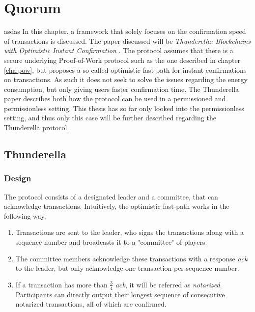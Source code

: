 \chapter{Quorum}
\label{cha:Results}
asdas
\iffalse
In this chapter, a framework that solely focuses on the confirmation speed of transactions is discussed. The paper discussed will be \emph{Thunderella: Blockchains with Optimistic Instant Confirmation} \cite{thunderella}. The protocol assumes that there is a secure underlying Proof-of-Work protocol such as the one described in chapter \ref{cha:pow}, but proposes a so-called optimistic fast-path for instant confirmations on transactions. As such it does not seek to solve the issues regarding the energy consumption, but only giving users faster confirmation time. The Thunderella paper describes both how the protocol can be used in a permissioned and permissionless setting. This thesis has so far only looked into the permissionless setting, and thus only this case will be further described regarding the Thunderella protocol.

\section{Thunderella}

\subsection{Design}

The protocol consists of a designated leader and a committee, that can acknowledge transactions. Intuitively, the optimistic fast-path works in the following way.

\begin{enumerate}
    \item Transactions are sent to the leader, who signs the transactions along with a sequence number and broadcasts it to a "committee" of players.
    \item The committee members acknowledge these transactions with a response \emph{ack} to the leader, but only acknowledge one transaction per sequence number.
    \item If a transaction has more than $\frac{3}{4}$ \emph{ack}, it will be referred as \emph{notarized}. Participants can directly output their longest sequence of consecutive notarized transactions, all of which are confirmed.
\end{enumerate}

